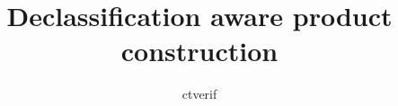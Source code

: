 \documentclass{llncs}
\title{Declassification aware product construction}
\author{ctverif}
\newcommand{\wassign}[2]{#1 := #2}
\begin{document}
\maketitle

\newcommand{\eff}{\mathsf{false}}
\newcommand{\ett}{\mathsf{true}}
\newcommand{\sideL}{\mathtt{1}}
\newcommand{\sideR}{\mathtt{2}}

\newcommand{\side}[2]{#2\{\!#1\!\}}
\newcommand{\lside}[1]{\side{\sideL}{#1}}
\newcommand{\rside}[1]{\side{\sideR}{#1}}

\newcommand{\X}{\mathsf{\_}} %
\newcommand{\vside}{\mathit{lr}} %

\newcommand{\nil}{\epsilon}
\newcommand{\cons}[2]{#1::#2}

\newcommand{\ok}{\mathsf{ok}}
\newcommand{\oksc}{\mathsf{okSC}}
\newcommand{\countL}{\mathsf{countL}}
\newcommand{\countR}{\mathsf{countR}}
\newcommand{\leakL}[1]{\mathsf{leakL}[#1]}

\newcommand{\recordL}[2]{\wassign{\leakL{#1}}{#2}}
\newcommand{\checkL}[3]{\wassign{#1}{#1 \wedge (#2=#3)}}

\newcommand{\RecLeak}[2]{\mathrm{ProcLeak}^{\!#1}\!(#2)}	%
\newcommand{\EqSeq}[2]{\mathrm{EqSeq}(#1,#2)}	%
\newcommand{\Mirror}[2]{\mathrm{Mirror}^{#1}\!(#2)}		%
\newcommand{\SelfComp}[1]{\mathrm{SelfComp}(#1)}		%
\end{document}
